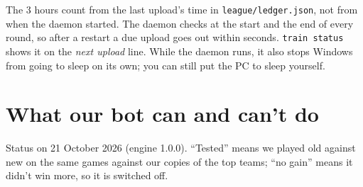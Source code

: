 \documentclass[11pt,a4paper]{article}
\newcommand{\f}[1]{\texttt{#1}}
\begin{document}
The 3 hours count from the last upload's time in \f{league/ledger.json}, not from when the daemon
started. The daemon checks at the start and the end of every round, so after a restart a due upload goes
out within seconds. \f{train status} shows it on the \emph{next upload} line. While the daemon runs, it
also stops Windows from going to sleep on its own; you can still put the PC to sleep yourself.

\section{What our bot can and can't do}\label{sec:can}
Status on 21 October 2026 (engine 1.0.0). ``Tested'' means we played old against new on the same games
against our copies of the top teams; ``no gain'' means it didn't win more, so it is switched off.
\end{document}
